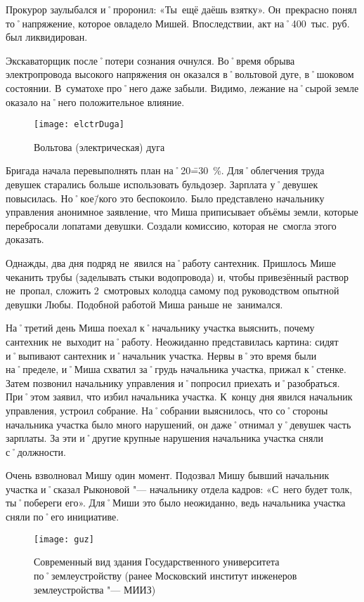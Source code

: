Прокурор заулыбался и˚проронил: «Ты~ещё даёшь взятку». Он~прекрасно понял то˚напряжение, которое овладело Мишей. Впоследствии, акт на˚400~тыс. руб. был ликвидирован.

Экскаваторщик после˚потери сознания очнулся. Во˚время обрыва электропровода высокого напряжения он оказался в˚вольтовой дуге, в˚шоковом состоянии. В~суматохе про˚него даже забыли. Видимо, лежание на˚сырой земле оказало на˚него положительное влияние. 

\begin{wrapfigure}[15]{O}{.4\textwidth}
\centering
\texttt{[image: elctrDuga]}
\caption{Вольтова (электрическая) дуга}
\label{fig:elctrDuga}
\end{wrapfigure}

Бригада начала перевыполнять план на˚20\==30~\%. Для˚облегчения труда девушек старались больше использовать бульдозер. Зарплата у˚девушек повысилась. Но˚кое\=/кого это беспокоило. Было представлено начальнику управления анонимное заявление, что Миша приписывает объёмы земли, которые перебросали лопатами девушки. Создали комиссию, которая не~смогла этого доказать.

Однажды, два дня подряд не~явился на˚работу сантехник. Пришлось Мише чеканить трубы (заделывать стыки водопровода) и, чтобы привезённый раствор не~пропал, сложить 2~смотровых колодца самому под руководством опытной девушки Любы. Подобной работой Миша раньше не~занимался.

На˚третий день Миша поехал к˚начальнику участка выяснить, почему сантехник не~выходит на˚работу. Неожиданно представилась картина: сидят и˚выпивают сантехник и˚начальник участка. Нервы в˚это время были на˚пределе, и˚Миша схватил за˚грудь начальника участка, прижал к˚стенке. Затем позвонил начальнику управления и˚попросил приехать и˚разобраться. При˚этом заявил, что избил начальника участка. К~концу дня явился начальник управления, устроил собрание. На˚собрании выяснилось, что со˚стороны начальника участка было много нарушений, он даже˚отнимал у˚девушек часть зарплаты. За эти и˚другие крупные нарушения начальника участка сняли с˚должности. 

Очень взволновал Мишу один момент. Подозвал Мишу бывший начальник участка и˚сказал Рыконовой "--- начальнику отдела кадров: «С~него будет толк, ты˚побереги его». Для˚Миши это было неожиданно, ведь начальника участка сняли по˚его инициативе. 

\begin{wrapfigure}{O}{.4\textwidth}
\centering
\texttt{[image: guz]}
\caption[Современный вид здания Государственного университета по˚землеустройству (Ранее Московский институт инженеров землеустройства "--- МИИЗ)]{Современный вид здания Государственного университета по˚землеустройству (ранее Московский институт инженеров землеустройства "--- МИИЗ)\footnotemark}
\label{fig:guz}
\end{wrapfigure}

